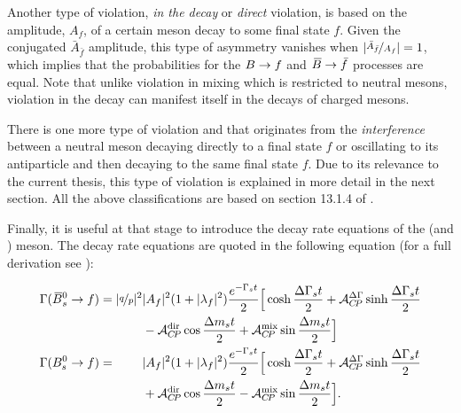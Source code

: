 Another type of \CP violation, {\it in the decay} or {\it direct} \CP violation, is based on the
amplitude, $A_f$, of a certain meson decay to some final state $f$. Given the \CP conjugated $\bar{A}_{\bar{f}}$
amplitude, this type of asymmetry vanishes when $|\nicefrac{\bar{A}_{\bar{f}}}{A_f}| = 1$,
which implies that the probabilities for the $B \rightarrow f$ and $\kern 0.18em\overline{\kern -0.18em B}{} \rightarrow \bar{f}$ processes are equal.
Note that unlike \CP violation in mixing which is restricted to neutral mesons,
\CP violation in the decay can manifest itself in the decays of charged mesons.

There is one more type of \CP violation and that originates from the {\it interference} between
a neutral meson decaying directly to a final state $f$ or oscillating to its antiparticle and then decaying
to the same final state $f$. Due to its relevance to the current thesis, this type of \CP violation is explained
in more detail in the next section. All the above classifications are based on section 13.1.4 of \cite{PDG}.

Finally, it is useful at that stage to introduce the decay rate equations of the \Bs (and \Bsb) meson.
The decay rate equations are quoted in the following equation (for a full derivation see \cite{PDG,DeBruyn-thesis,jeroenThesis}):

\newcommand{\ampSq}{\ensuremath{|A_f|^2}\xspace}
\newcommand{\ampBSq}{\ensuremath{|\bar{A}_f|^2}\xspace}
\newcommand{\lambSq}{\ensuremath{|\lambda_f|^2}\xspace}
\newcommand{\eGammast}{\ensuremath{e^{-\Gamma_s t}}\xspace}
\newcommand{\qopSq}{\ensuremath{|\qoverp|^2}\xspace}
\newcommand{\DeltaGammat}{\ensuremath{\frac{\Delta\Gamma_s t}{2}}\xspace}
\newcommand{\DeltaMt}{\ensuremath{\frac{\Delta m_s t}{2}}\xspace}

\begin{subequations}
 \label{decay_rate_master_eqs}
 \begin{align}
 \centering
    \Gamma(\Bsb \to f) =          \qopSq & \ampSq (1+\lambSq) \frac{\eGammast}{2} \Big[ \cosh\DeltaGammat + \Acp{\Delta\Gamma}\sinh\DeltaGammat \nonumber \\
                                         &  - \Acp{\rm dir}\cos\DeltaMt + \Acp{\rm mix}\sin\DeltaMt \Big]  \\
    \Gamma(\Bs \to f) = \phantom{\qopSq} & \ampSq (1+\lambSq) \frac{\eGammast}{2} \Big[ \cosh\DeltaGammat + \Acp{\Delta\Gamma}\sinh\DeltaGammat \nonumber  \\
                                         & + \Acp{\rm dir}\cos\DeltaMt - \Acp{\rm mix}\sin\DeltaMt \Big].
 \end{align}
\end{subequations}

